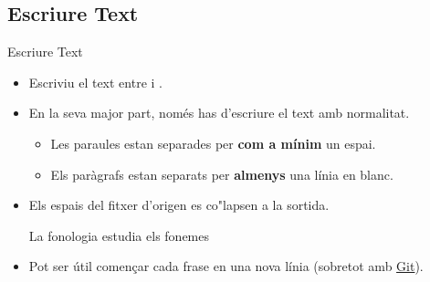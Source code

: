 \begin{frame}[fragile]{\wllogo}
\end{frame}

\subsection{Escriure Text}
\begin{frame}[fragile]{Escriure Text}
\small
\begin{itemize}
\item Escriviu el text entre  i .
\item En la seva major part, només has d'escriure el text amb normalitat.

\begin{itemize}
    \item Les paraules estan separades per \textbf{com a mínim} un espai.
    \item Els paràgrafs estan separats per \textbf{almenys} una línia en blanc.
\end{itemize}

\item Els espais del fitxer d'origen es co"lapsen a la sortida.
\begin{exampletwouptiny}
La          fonologia
    estudia els fonemes
\end{exampletwouptiny}
\item Pot ser útil començar cada frase en una nova línia (sobretot amb \href{https://git-scm.com/}{Git}).
\end{itemize}
\end{frame}


